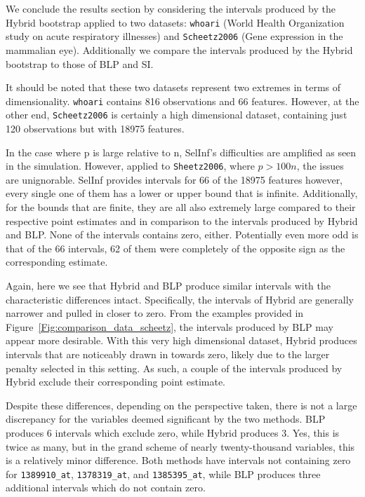 We conclude the results section by considering the intervals produced by the Hybrid bootstrap applied to two datasets: \texttt{whoari} (World Health Organization study on acute respiratory illnesses) and \texttt{Scheetz2006} (Gene expression in the mammalian eye). Additionally we compare the intervals produced by the Hybrid bootstrap to those of BLP and SI.

It should be noted that these two datasets represent two extremes in terms of dimensionality. \texttt{whoari} contains 816 observations and 66 features. However, at the other end, \texttt{Scheetz2006} is certainly a high dimensional dataset, containing just 120 observations but with 18975 features.


In the case where p is large relative to n, SelInf's difficulties are amplified as seen in the simulation. However, applied to \texttt{Sheetz2006}, where $p > 100n$, the issues are unignorable. SelInf provides intervals for 66 of the 18975 features however, every single one of them has a lower or upper bound that is infinite. Additionally, for the bounds that are finite, they are all also extremely large compared to their respective point estimates and in comparison to the intervals produced by Hybrid and BLP. None of the intervals contains zero, either. Potentially even more odd is that of the 66 intervals, 62 of them were completely of the opposite sign as the corresponding estimate. 

Again, here we see that Hybrid and BLP produce similar intervals with the characteristic differences intact. Specifically, the intervals of Hybrid are generally narrower and pulled in closer to zero. From the examples provided in Figure~\ref{Fig:comparison_data_scheetz}, the intervals produced by BLP may appear more desirable. With this very high dimensional dataset, Hybrid produces intervals that are noticeably drawn in towards zero, likely due to the larger penalty selected in this setting. As such, a couple of the intervals produced by Hybrid exclude their corresponding point estimate. 

Despite these differences, depending on the perspective taken, there is not a large discrepancy for the variables deemed significant by the two methods. BLP produces 6 intervals which exclude zero, while Hybrid produces 3. Yes, this is twice as many, but in the grand scheme of nearly twenty-thousand variables, this is a relatively minor difference. Both methods have intervals not containing zero for \texttt{1389910\_at}, \texttt{1378319\_at}, and \texttt{1385395\_at}, while BLP produces three additional intervals which do not contain zero.

